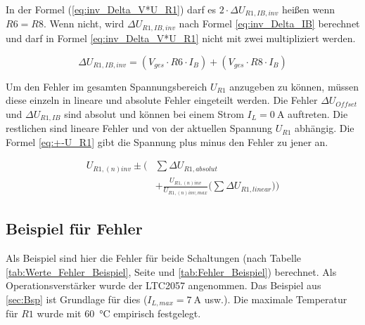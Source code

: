In der Formel (\ref{eq:inv_Delta_V*U_R1}) darf es $2 \cdot \Delta U_{R1,IB,inv}$ heißen wenn $R6 = R8$.
Wenn nicht, wird $\Delta U_{R1,IB,inv}$ nach Formel \ref{eq:inv_Delta_IB} berechnet und darf in Formel \ref{eq:inv_Delta_V*U_R1} 
nicht mit zwei multipliziert werden.

\begin{equation}
	\label{eq:inv_Delta_IB}
	\Delta U_{R1,IB,inv} = (V_{ges} \cdot R6 \cdot I_{B}) + (V_{ges} \cdot R8 \cdot I_{B})
\end{equation}

Um den Fehler im gesamten Spannungsbereich $U_{R1}$ anzugeben zu können, müssen diese einzeln in 
lineare und absolute Fehler eingeteilt werden. 
Die Fehler $\Delta U_{Offset}$ und $\Delta U_{R1,IB}$ sind absolut und können bei einem Strom 
$I_{L} = \SI{0}{\ampere}$ auftreten.
Die restlichen sind lineare Fehler und von der aktuellen Spannung $U_{R1}$ abhängig. 
Die Formel \ref{eq:+-U_R1} gibt die Spannung plus minus den Fehler zu jener an.

\begin{equation}
	\label{eq:+-U_R1}
	\begin{split}
		U_{R1,(n)inv} \pm \bigg(&\sum \Delta U_{R1,absolut} \\
		&+ \frac{U_{R1,(n)inv}}{U_{R1,(n)inv,max}} \Big(\sum \Delta U_{R1,linear} \Big) \bigg)
	\end{split}
\end{equation}


\subsection{Beispiel für Fehler}

Als Beispiel sind hier die Fehler für beide Schaltungen (nach Tabelle \ref{tab:Werte_Fehler_Beispiel}, 
Seite \pageref{tab:Werte_Fehler_Beispiel} und \ref{tab:Fehler_Beispiel}) 
berechnet. Als Operationsverstärker wurde der LTC2057 \cite{LTC2057} angenommen. 
Das Beispiel aus \ref{sec:Bsp} ist Grundlage für dies ($I_{L,max} = \SI{7}{\ampere}$ usw.). 
Die maximale Temperatur für $R1$ wurde mit \SI{+60}{\degreeCelsius} empirisch festgelegt.

